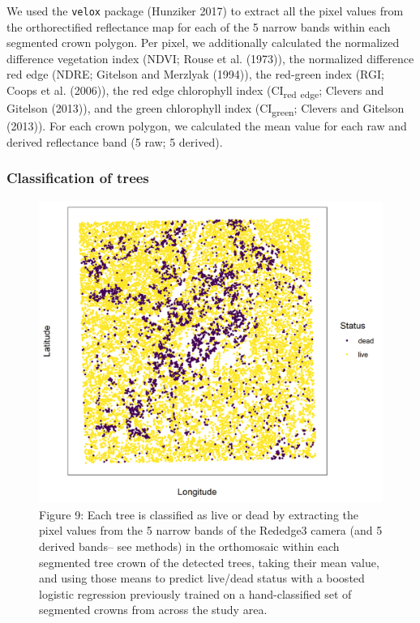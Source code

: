 \documentclass[]{article}
\begin{document}
We used the \texttt{velox} package (Hunziker 2017) to extract all the
pixel values from the orthorectified reflectance map for each of the 5
narrow bands within each segmented crown polygon. Per pixel, we
additionally calculated the normalized difference vegetation index
(NDVI; Rouse et al. (1973)), the normalized difference red edge (NDRE;
Gitelson and Merzlyak (1994)), the red-green index (RGI; Coops et al.
(2006)), the red edge chlorophyll index (CI\textsubscript{red}
\textsubscript{edge}; Clevers and Gitelson (2013)), and the green
chlorophyll index (CI\textsubscript{green}; Clevers and Gitelson
(2013)). For each crown polygon, we calculated the mean value for each
raw and derived reflectance band (5 raw; 5 derived).

\subsubsection{Classification of trees}\label{classification-of-trees}

\begin{figure}
\centering
\includegraphics{../../figures/eldo_3k_3_live_dead.png}
\caption{Figure 9: Each tree is classified as live or dead by extracting
the pixel values from the 5 narrow bands of the Rededge3 camera (and 5
derived bands-- see methods) in the orthomosaic within each segmented
tree crown of the detected trees, taking their mean value, and using
those means to predict live/dead status with a boosted logistic
regression previously trained on a hand-classified set of segmented
crowns from across the study area.}
\end{figure}
\end{document}
